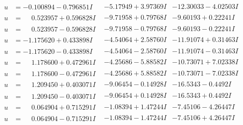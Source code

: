 \documentclass[1p]{elsarticle_modified}
\theoremstyle{definition}
\begin{document}
$$\begin{array}{c|c|c}
\begin{aligned}
u &= -0.100894 - 0.796851 I\end{aligned}
 & -5.17949 + 3.97369 I & -12.30033 - 4.02503 I \\ \hline\begin{aligned}
u &= \phantom{-}0.523957 + 0.596828 I\end{aligned}
 & -9.71958 + 0.79768 I & -9.60193 + 0.22241 I \\ \hline\begin{aligned}
u &= \phantom{-}0.523957 - 0.596828 I\end{aligned}
 & -9.71958 - 0.79768 I & -9.60193 - 0.22241 I \\ \hline\begin{aligned}
u &= -1.175620 + 0.433898 I\end{aligned}
 & -4.54064 + 2.58760 I & -11.91074 + 0.31463 I \\ \hline\begin{aligned}
u &= -1.175620 - 0.433898 I\end{aligned}
 & -4.54064 - 2.58760 I & -11.91074 - 0.31463 I \\ \hline\begin{aligned}
u &= \phantom{-}1.178600 + 0.472961 I\end{aligned}
 & -4.25686 - 5.88582 I & -10.73071 + 7.02338 I \\ \hline\begin{aligned}
u &= \phantom{-}1.178600 - 0.472961 I\end{aligned}
 & -4.25686 + 5.88582 I & -10.73071 - 7.02338 I \\ \hline\begin{aligned}
u &= \phantom{-}1.209450 + 0.403071 I\end{aligned}
 & -9.06454 - 0.14928 I & -16.5343 - 0.4492 I \\ \hline\begin{aligned}
u &= \phantom{-}1.209450 - 0.403071 I\end{aligned}
 & -9.06454 + 0.14928 I & -16.5343 + 0.4492 I \\ \hline\begin{aligned}
u &= \phantom{-}0.064904 + 0.715291 I\end{aligned}
 & -1.08394 + 1.47244 I & -7.45106 - 4.26447 I \\ \hline\begin{aligned}
u &= \phantom{-}0.064904 - 0.715291 I\end{aligned}
 & -1.08394 - 1.47244 I & -7.45106 + 4.26447 I \\ \hline\begin{aligned}

\end{aligned}
\end{array}$$
\end{document}

